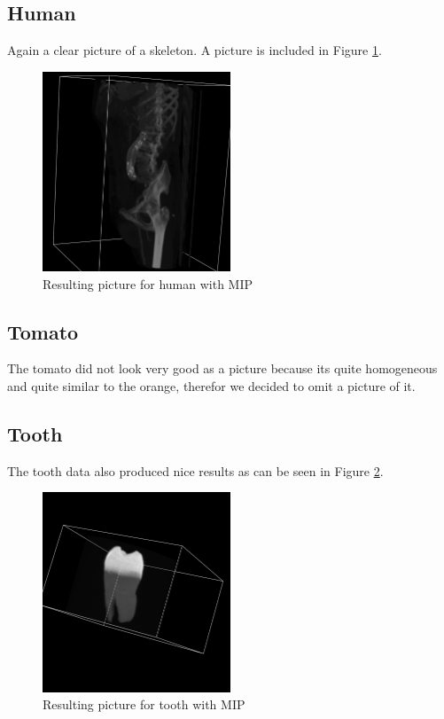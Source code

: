 \documentclass[a4paper,twoside,11pt]{article}
\begin{document}
\subsection{Human}
Again a clear picture of a skeleton. A picture is included in Figure \ref{MH}.
\begin{figure}[!h]
  \centering
  \includegraphics[width=0.5\textwidth]{MH.png}
  \caption{Resulting picture for human with MIP}
  \label{MH}
\end{figure}

\subsection{Tomato}
The tomato did not look very good as a picture because its quite homogeneous and quite similar to the orange, therefor we decided to omit a picture of it.

\subsection{Tooth}
The tooth data also produced nice results as can be seen in Figure \ref{MT}.
\begin{figure}[!h]
  \centering
  \includegraphics[width=0.5\textwidth]{MT.png}
  \caption{Resulting picture for tooth with MIP}
  \label{MT}
\end{figure}
\end{document}
